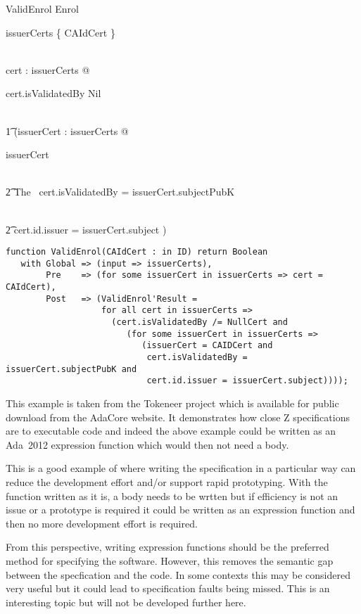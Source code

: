 \documentclass{llncs}
\newcommand{\adatwtw}{Ada~2012\xspace}
\begin{document}
\begin{schema}{ValidEnrol}
Enrol\\
\where

        issuerCerts \cap \{ CAIdCert \} \neq \emptyset

\also

\\      \forall cert : issuerCerts @ 

           cert.isValidatedBy \neq Nil 

\\      \t1     \land (\exists issuerCert : issuerCerts @ 

        issuerCert 

\\      \t2     \land The \ cert.isValidatedBy = issuerCert.subjectPubK

\\      \t2     \land cert.id.issuer = issuerCert.subject )   

\end{schema}

\begin{lstlisting}
function ValidEnrol(CAIdCert : in ID) return Boolean
   with Global => (input => issuerCerts),
        Pre    => (for some issuerCert in issuerCerts => cert = CAIdCert),
        Post   => (ValidEnrol'Result = 
                   for all cert in issuerCerts => 
                     (cert.isValidatedBy /= NullCert and
                        (for some issuerCert in issuerCerts => 
                           (issuerCert = CAIDCert and
                            cert.isValidatedBy = issuerCert.subjectPubK and
                            cert.id.issuer = issuerCert.subject))));
\end{lstlisting}

This example is taken from the Tokeneer project which is available for public download from the AdaCore website.  It demonstrates how close Z specifications are to executable code and indeed the above example could be written as an \adatwtw expression function which would then not need a body. 

This is a good example of where writing the specification in a particular way can reduce the development effort and/or support rapid prototyping. With the function written as it is, a body needs to be wrtten but if efficiency is not an issue or a prototype is required it could be written as an expression function and then no more development effort is required. 

From this perspective, writing expression functions should be the preferred method for specifying the software. However, this removes the semantic gap between the specfication and the code. In some contexts this may be considered very useful but it could lead to specification faults being missed. This is an interesting topic but will not be developed further here.
\end{document}

